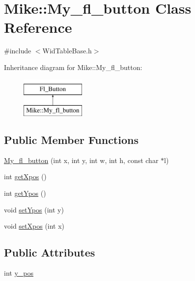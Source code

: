 \hypertarget{class_mike_1_1_my__fl__button}{}\section{Mike\+:\+:My\+\_\+fl\+\_\+button Class Reference}
\label{class_mike_1_1_my__fl__button}


{\ttfamily \#include $<$Wid\+Table\+Base.\+h$>$}

Inheritance diagram for Mike\+:\+:My\+\_\+fl\+\_\+button\+:\begin{figure}[H]
\begin{center}
\leavevmode
\includegraphics[height=2.000000cm]{class_mike_1_1_my__fl__button}
\end{center}
\end{figure}
\subsection*{Public Member Functions}
\begin{DoxyCompactItemize}
\item 
\hyperlink{class_mike_1_1_my__fl__button_a3339012650ecdf33d2cb219ec88e7c45}{My\+\_\+fl\+\_\+button} (int x, int y, int w, int h, const char $\ast$l)
\item 
int \hyperlink{class_mike_1_1_my__fl__button_a046314695eb006cecb6f54dc0f1057e9}{get\+Xpos} ()
\item 
int \hyperlink{class_mike_1_1_my__fl__button_a6e8291f5f02866c53ac7354b53193367}{get\+Ypos} ()
\item 
void \hyperlink{class_mike_1_1_my__fl__button_a67886921f1394ca398fb9ea3f950fa23}{set\+Ypos} (int y)
\item 
void \hyperlink{class_mike_1_1_my__fl__button_a13bb440e147816fe6ebe80d499735b60}{set\+Xpos} (int x)
\end{DoxyCompactItemize}
\subsection*{Public Attributes}
\begin{DoxyCompactItemize}
\item 
int \hyperlink{class_mike_1_1_my__fl__button_ad7b1b7c9d613dc8813fd3439b04755cf}{y\+\_\+pos}
\end{DoxyCompactItemize}
